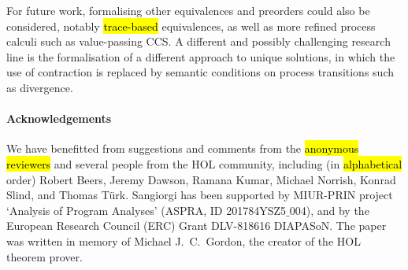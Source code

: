For  future work, formalising other equivalences and preorders could also be considered,
notably  \hl{trace-based} equivalences, as well as more refined process
calculi such as value-passing CCS.
%
A different and possibly challenging  research line is
 the formalisation of a different
approach \cite{DurierHS17,DurierHS18} to unique
solutions, in which the use of contraction is
replaced by semantic conditions on process transitions such as
divergence.
%


\paragraph{Acknowledgements}

We have  benefitted from suggestions and comments 
from  the \hl{anonymous reviewers} and several people from the HOL
community, including (in \hl{alphabetical} order) Robert Beers, Jeremy Dawson,
Ramana Kumar,
Michael Norrish, 
Konrad Slind, and
Thomas T\"{u}rk.
%
Sangiorgi has been  supported by 
 MIUR-PRIN project `Analysis of
Program Analyses' (ASPRA, ID 201784YSZ5$\_$004), and by the 
European Research
Council (ERC) Grant DLV-818616 DIAPASoN.
The paper was written in memory of Michael J.~C.~Gordon, the creator of the HOL theorem prover.
